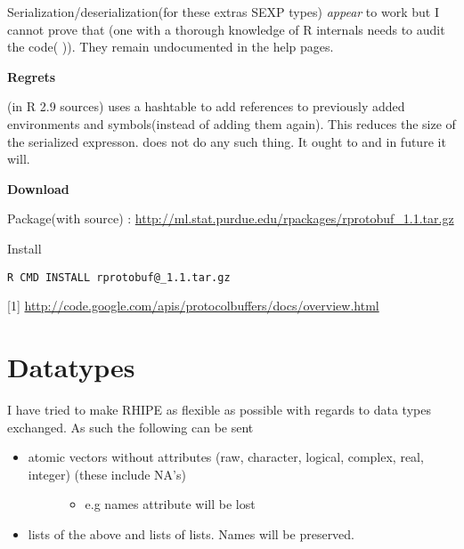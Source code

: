 \documentclass[letterpaper,10pt,english]{manual}
\begin{document}
Serialization/deserialization(for these extras SEXP types)  \emph{appear} to work but I cannot prove that (one with a thorough knowledge of R internals needs to audit the code(  )). They remain undocumented in the help pages.

\textbf{Regrets}

 (in R 2.9 sources) uses a hashtable to add references to previously added environments and symbols(instead of adding them again). This reduces the size of the serialized expresson.  does not do any such thing. It ought to and in future it will.

\textbf{Download}

Package(with source) : \href{http://ml.stat.purdue.edu/rpackages/rprotobuf\_1.1.tar.gz}{http://ml.stat.purdue.edu/rpackages/rprotobuf\_1.1.tar.gz}

Install

\begin{Verbatim}[commandchars=@\[\]]
R CMD INSTALL rprotobuf@_1.1.tar.gz
\end{Verbatim}

{[}1{]} \href{http://code.google.com/apis/protocolbuffers/docs/overview.html}{http://code.google.com/apis/protocolbuffers/docs/overview.html}

\resetcurrentobjects
\hypertarget{--doc-datatypes}{}

\chapter{Datatypes}

I have tried to make RHIPE as flexible as possible with regards to data types exchanged. As such the following can be sent
\begin{itemize}
\item {} \begin{description}
\item[atomic vectors without attributes (raw, character, logical, complex, real, integer) (these include NA's)]\begin{itemize}
\item {} 
e.g names attribute will be lost

\end{itemize}

\end{description}

\item {} 
lists of the above and lists of lists. Names will be preserved.

\end{itemize}
\end{document}
